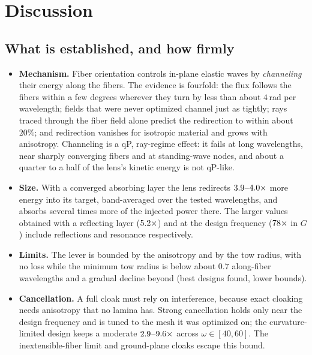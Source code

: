 \section{Discussion}\label{sec:discussion}

\subsection{What is established, and how firmly}
\begin{itemize}[itemsep=2pt]
\item \textbf{Mechanism.} Fiber orientation controls in-plane elastic waves by \emph{channeling} their energy
  along the fibers. The evidence is fourfold: the flux follows the fibers within a few degrees wherever they
  turn by less than about $4$\,rad per wavelength; fields that were never optimized channel just as
  tightly; rays traced through the fiber field alone predict the redirection to within about $20\%$; and
  redirection vanishes for isotropic material and grows with anisotropy. Channeling is a qP, ray-regime
  effect: it fails at long wavelengths, near sharply converging fibers and at standing-wave nodes, and
  about a quarter to a half of the lens's kinetic energy is not qP-like.
\item \textbf{Size.} With a converged absorbing layer the lens redirects $3.9$--$4.0\times$ more
  energy into its target, band-averaged over the tested wavelengths, and absorbs several times more of the
  injected power there. The larger values obtained with a reflecting layer ($5.2\times$) and at the
  design frequency ($78\times$ in $G$) include reflections and resonance respectively.
\item \textbf{Limits.} The lever is bounded by the anisotropy and by the tow radius, with no loss while the
  minimum tow radius is below about $0.7$ along-fiber wavelengths and a gradual decline beyond (best designs
  found, lower bounds).
\item \textbf{Cancellation.} A full cloak must rely on interference, because exact cloaking needs anisotropy
  that no lamina has. Strong cancellation holds only near the design frequency and is tuned to the mesh it
  was optimized on; the curvature-limited design keeps a moderate $2.9$--$9.6\times$ across
  $\omega\in[40,60]$. The inextensible-fiber limit \cite{olsson2011} and ground-plane cloaks \cite{chen2011,popa2011}
  escape this bound.
\end{itemize}

